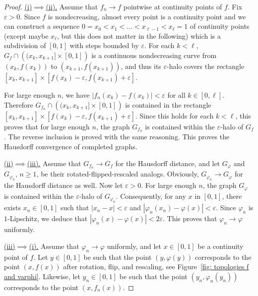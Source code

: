 \documentclass[a4paper,11pt]{amsart}
\newcommand{\eps}{\varepsilon}
\theoremstyle{definition}
\begin{document}
\begin{proof}
    \underline{(i)$\implies$(ii).}
    Assume that $f_n \to f$ pointwise at continuity points of $f$.
    Fix $\eps>0$.
    Since $f$ is nondecreasing, almost every point is a continuity point and we can construct a sequence $0=x_0 < x_1 < \dots < x_{\ell-1} < x_\ell=1$ of continuity points (except maybe $x_\ell$, but this does not matter in the following) which is a subdivision of $[0,1]$ with steps bounded by $\eps$.
    For each $k<\ell$, $G_f \cap \left( (x_k,x_{k+1}]\times[0,1] \right)$ is a continuous nondecreasing curve from $(x_k, f(x_k))$ to $(x_{k+1}, f(x_{k+1}))$, and thus its $\eps$-halo covers the rectangle $[x_k, x_{k+1}] \times [f(x_k)-\eps, f(x_{k+1})+\eps]$.
    
    For large enough $n$, we have $\left| f_n(x_k) - f(x_k) \right| < \eps$ for all $k\in[0,\ell]$.
    Therefore $G_{f_n} \cap \left( (x_k,x_{k+1}]\times[0,1] \right)$ is contained in the rectangle $[x_k, x_{k+1}] \times [f(x_k)-\eps, f(x_{k+1})+\eps]$.
    Since this holds for each $k<\ell$, this proves that for large enough $n$, the graph $G_{f_n}$ is contained within the $\eps$-halo of $G_f$.
    The reverse inclusion is proved with the same reasoning.
    This proves the Hausdorff convergence of completed graphs.
    \medskip
    
    \underline{(ii)$\implies$(iii).}
    Assume that $G_{f_n} \to G_f$ for the Hausdorff distance, and let $G_{\varphi}$ and $G_{\varphi_n}$, $n\ge1$, be their rotated-flipped-rescaled analogs.
    Obviously, $G_{\varphi_n} \to G_\varphi$ for the Hausdorff distance as well.
    Now let $\eps>0$.
    For large enough $n$, the graph $G_\varphi$ is contained within the $\eps$-halo of $G_{\varphi_n}$.
    Consequently, for any $x$ in $[0,1]$, there exists $x_n\in[0,1]$ such that $|x_n-x|<\eps$ and $|\varphi_n(x_n) - \varphi(x)| < \eps$.
    Since $\varphi_n$ is $1$-Lipschitz, we deduce that $|\varphi_n(x) - \varphi(x)| < 2\eps$.
    This proves that $\varphi_n \to \varphi$ uniformly.
    \medskip
    
    \underline{(iii)$\implies$(i).}
    Assume that $\varphi_n \to \varphi$ uniformly, and let $x\in[0,1]$ be a continuity point of $f$.
    Let $y\in[0,1]$ be such that the point $(y,\varphi(y))$ corresponds to the point $(x,f(x))$ after rotation, flip, and rescaling, see Figure~\ref{fig: topologies f and varphi}.
    Likewise, let $y_n\in[0,1]$ be such that the point $(y_n,\varphi_n(y_n))$ corresponds to the point $(x,f_n(x))$.
    

\end{proof}
\end{document}

